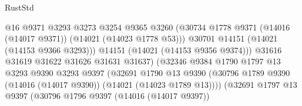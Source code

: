 \begin{lexlean}{RustStd}
\begin{coremodule}
                                              @16
                                              @9371
                                              @3293
                                              @3273
                                              @3254
                                              @9365
                                              @3260
                                              (@30734
                                                @1778
                                                @9371
                                                (@14016 (@14017 @9371))
                                                (@14021 (@14023 @1778 @53)))
                                              @30701
                                              @14151
                                              (@14021 (@14153 @9366 @3293)))
                                            @14151
                                            (@14021 (@14153 @9356 @9374)))
                                          @31616
                                          @31619
                                          @31622
                                          @31626
                                          @31631
                                          @31637)
                                        (@32346
                                          @9384
                                          @1790
                                          @1797
                                          @13
                                          @3293
                                          @9390
                                          @3293
                                          @9397
                                          (@32691
                                            @1790
                                            @13
                                            @9390
                                            (@30796
                                              @1789
                                              @9390
                                              (@14016 (@14017 @9390))
                                              (@14021 (@14023 @1789 @13))))
                                          (@32691
                                            @1797
                                            @13
                                            @9397
                                            (@30796
                                              @1796
                                              @9397
                                              (@14016 (@14017 @9397))

\end{coremodule}
\end{lexlean}
